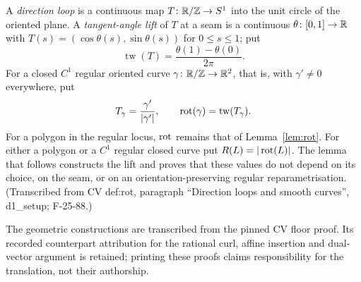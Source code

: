 \begin{definition}\label{cf:def-turning}
A \emph{direction loop} is a continuous map $T\colon\mathbb R/\mathbb Z\to S^1$ into
the unit circle of the oriented plane. A \emph{tangent-angle lift} of $T$
at a seam is a continuous $\theta\colon[0,1]\to\mathbb R$ with
$T(s)=(\cos\theta(s),\sin\theta(s))$ for $0\leq s\leq1$; put
\[
   \operatorname{tw}(T)=\frac{\theta(1)-\theta(0)}{2\pi}.
\]
For a closed $C^1$ regular oriented curve $\gamma\colon\mathbb R/\mathbb Z\to\mathbb R^2$,
that is, with $\gamma'\neq0$ everywhere, put
\[
   T_\gamma=\frac{\gamma'}{|\gamma'|},\qquad
   \operatorname{rot}(\gamma)=\operatorname{tw}(T_\gamma).
\]
For a polygon in the regular locus, $\operatorname{rot}$ remains that of
Lemma~\ref{lem:rot}. For either a polygon or a $C^1$ regular closed curve
put $R(L)=|\operatorname{rot}(L)|$. The lemma that follows constructs the lift and
proves that these values do not depend on its choice, on the seam, or on
an orientation-preserving regular reparametrisation. (Transcribed from CV
def:rot, paragraph ``Direction loops and smooth curves'', d1\_setup;
F-25-88.)
\end{definition}

The geometric constructions are transcribed from the pinned CV floor
proof. Its recorded counterpart attribution for the rational curl,
affine insertion and dual-vector argument is retained; printing these
proofs claims responsibility for the translation, not their authorship.

